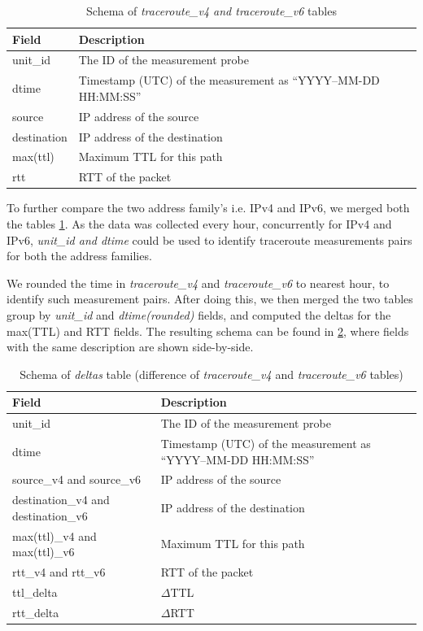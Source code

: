 \begin{table}[!h]
	\centering
	\caption{Schema of \textit{traceroute\_v4 and traceroute\_v6} tables}
	\label{table:traceroutev4v6mlab}
	\begin{tabular}{lp{8cm}}
  		\toprule
  		\textbf{Field} & \textbf{Description} \\ 
  		\midrule
  		unit\_id & The ID of the measurement probe \\ 
  		dtime & Timestamp (UTC) of the measurement as “YYYY–MM-DD HH:MM:SS” \\  
		source &  IP address of the source \\ 
		destination & IP address of the destination \\   
		max(ttl) & Maximum TTL for this path \\ 
		rtt & RTT of the packet \\
  		\bottomrule
\end{tabular}
\end{table}

\FloatBarrier

To further compare the two address family's i.e. IPv4 and IPv6, we merged both the tables \cref{table:traceroutev4v6mlab}. As the data was collected every hour, concurrently for IPv4 and IPv6, \textit{unit\_id and dtime} could be used to identify traceroute measurements pairs for both the address families. 

We rounded the time in \textit{traceroute\_v4} and \textit{traceroute\_v6} to nearest hour, to identify such measurement pairs. After doing this, we then merged the two tables group by \textit{unit\_id} and \textit{dtime(rounded)} fields, and computed the deltas for the max(TTL) and RTT fields. The resulting schema can be found in \cref{table:deltasmlab}, where fields with the same description are shown side-by-side.

\begin{table}[!h]
	\centering
	\caption{Schema of \textit{deltas} table (difference of \textit{traceroute\_v4} and \textit{traceroute\_v6} tables)}
	\label{table:deltasmlab}
	\begin{tabular}{lp{8cm}}
  		\toprule
  		\textbf{Field} & \textbf{Description} \\ 
  		\midrule
  		unit\_id & The ID of the measurement probe \\ 
  		dtime & Timestamp (UTC) of the measurement as “YYYY–MM-DD HH:MM:SS” \\  
		source\_v4 and source\_v6 &  IP address of the source \\ 
		destination\_v4 and destination\_v6 & IP address of the destination \\   
		max(ttl)\_v4 and max(ttl)\_v6 & Maximum TTL for this path \\ 
		rtt\_v4 and rtt\_v6 & RTT of the packet \\
		ttl\_delta & $\Delta$TTL \\
		rtt\_delta & $\Delta$RTT \\
  		\bottomrule
\end{tabular}
\end{table}


